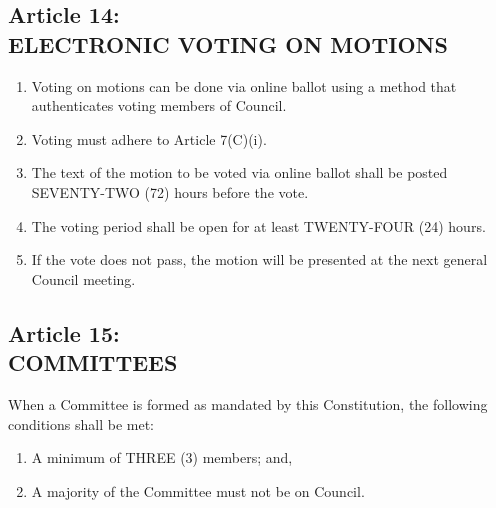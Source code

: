 \documentclass[]{report}
\begin{document}
\clearpage
\begin{center}
	\section*{Article 14:\\ELECTRONIC VOTING ON MOTIONS}
	\vspace{12px}
\end{center}
\label{}

	\renewcommand{\theenumi}{\Alph{enumi}}
	\begin{enumerate}
	
		\item Voting on motions can be done via online ballot using a method that authenticates voting members of Council.

		\item Voting must adhere to Article 7(C)(i).
		
		\item The text of the motion to be voted via online ballot shall be posted SEVENTY-TWO (72) hours before the vote.
		
		\item The voting period shall be open for at least TWENTY-FOUR (24) hours.
		
		\item If the vote does not pass, the motion will be presented at the next general Council meeting.
	
	\end{enumerate}


\clearpage
\begin{center}
	\section*{Article 15:\\COMMITTEES}
	\vspace{12px}
\end{center}
\label{}

	When a Committee is formed as mandated by this Constitution, the following conditions shall be met:\\
	
	\renewcommand{\theenumi}{\Alph{enumi}}
	\begin{enumerate}
	
		\item A minimum of THREE (3) members; and,
		
		\item A majority of the Committee must not be on Council.
		
	\end{enumerate}
\end{document}
